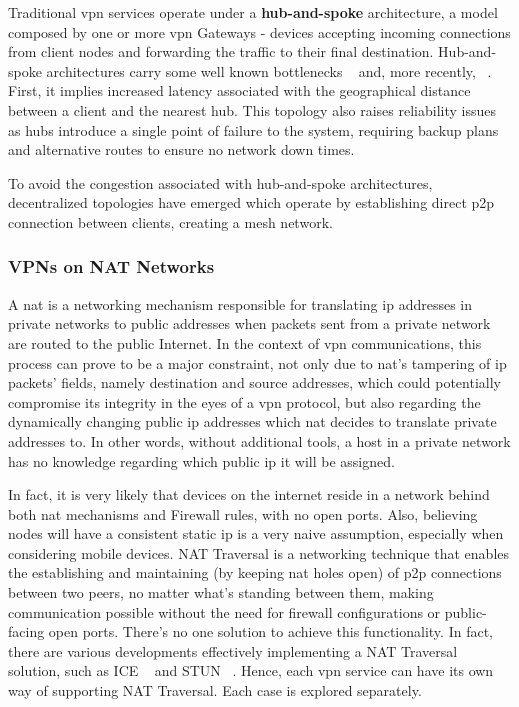 \documentclass[11pt,twoside,a4paper]{report}
\begin{document}
Traditional \ac{vpn} services operate under a \textbf{hub-and-spoke} architecture, a model composed by one or more \ac{vpn} Gateways - devices accepting incoming connections from client nodes and forwarding the traffic to their final destination. Hub-and-spoke architectures carry some well known bottlenecks ~\cite{ELHEDHLI20051615, o1998geographer} and, more recently, ~\cite{AN2015103}. First, it implies increased latency associated with the geographical distance between a client and the nearest hub. This topology also raises reliability issues as hubs introduce a single point of failure to the system, requiring backup plans and alternative routes to ensure no network down times.

To avoid the congestion associated with hub-and-spoke architectures, decentralized topologies have emerged which operate by establishing direct \ac{p2p} connection between clients, creating a mesh network.
\fi

\subsubsection{VPNs on NAT Networks}

A \ac{nat} is a networking mechanism responsible for translating \ac{ip} addresses in private networks to public addresses when packets sent from a private network are routed to the public Internet. In the context of \ac{vpn} communications, this process can prove to be a major constraint, not only due to \ac{nat}'s tampering of \ac{ip} packets' fields, namely destination and source addresses, which could potentially compromise its integrity in the eyes of a \ac{vpn} protocol, but also regarding the dynamically changing public \ac{ip} addresses which \ac{nat} decides to translate private addresses to. In other words, without additional tools, a host in a private network has no knowledge regarding which public \ac{ip} it will be assigned.

In fact, it is very likely that devices on the internet reside in a network behind both \ac{nat} mechanisms and Firewall rules, with no open ports. Also, believing nodes will have a consistent static \ac{ip} is a very naive assumption, especially when considering mobile devices. NAT Traversal is a networking technique that enables the establishing and maintaining (by keeping \ac{nat} holes open) of \ac{p2p} connections between two peers, no matter what's standing between them, making communication possible without the need for firewall configurations or public-facing open ports. There's no one solution to achieve this functionality. In fact, there are various developments effectively implementing a NAT Traversal solution, such as ICE ~\cite{rfc8445} and STUN ~\cite{rfc8489}. Hence, each \ac{vpn} service can have its own way of supporting NAT Traversal. Each case is explored separately.
\end{document}
